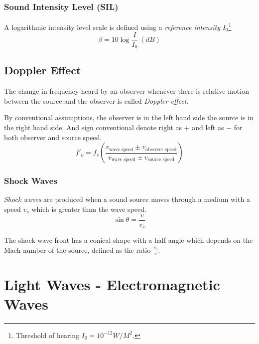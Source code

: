 \documentclass[openany]{book}
\begin{document}
\subsection{Sound Intensity Level (SIL)}
A logarithmic intensity level scale is defined using a \emph{reference intensity} $I_0$\footnote{Threshold of hearing $I_0=10^{-12}W/M^2$.}
\begin{equation}
\beta =10\log \frac{I}{I_0}\ (dB)
\end{equation}

\section{Doppler Effect}
The change in frequency heard by an observer whenever there is relative motion between the source and the observer is called \emph{Doppler effect}.

By conventional assumptions, the observer is in the left hand side the source is in the right hand side. And sign conventional denote right as $+$ and left as $-$ for both observer and source speed.
\begin{equation}\label{eq:doppler effect}
f'_o=f_s\left(\frac{v_{\text{wave speed}}\pm v_{\text{observer speed}}}{v_{\text{wave speed}}\pm v_{\text{source speed}}}\right)
\end{equation}
\subsection{Shock Waves}
\emph{Shock waves} are produced when a sound source moves through a medium with a speed $v_s$ which is greater than the wave speed.
\[\sin \theta =\frac{v}{v_s}\]

The shock wave front has a conical shape with a half angle which depends on the Mach number of the source, defined as the ratio $\frac{v_s}{v}$.

\chapter{Light Waves - Electromagnetic Waves}
\end{document}
